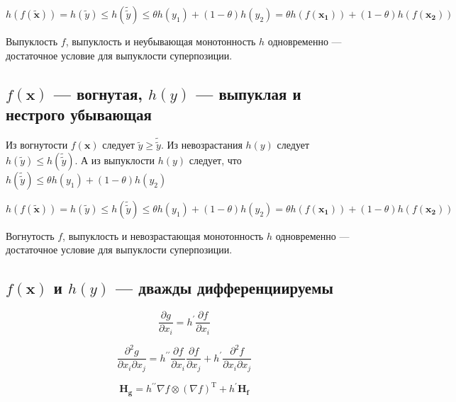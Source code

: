 	\begin{equation}
	h(f(\mathbf{\tilde{x}})) =h( \tilde{y}) \leqslant h(\tilde{\tilde{y}})
	\leqslant \theta h(y_1) + (1 - \theta) h(y_2) = \theta h(f(\mathbf{x_1})) + (1 -
	\theta) h(f(\mathbf{x_2}))
	\end{equation}
	
	Выпуклость $f$, выпуклость и неубывающая монотонность $h$ одновременно ---
	достаточное условие для выпуклости суперпозиции.
	
	\subsection{$f(\mathbf{x})$ --- вогнутая, $h(y)$ --- выпуклая и нестрого
		убывающая}
	
	Из вогнутости $f(\mathbf{x})$ следует $\tilde{y} \geqslant \tilde{\tilde{y}}$.
	Из невозрастания $h(y)$ следует $ h(\tilde{y}) \leqslant
	h({\tilde{\tilde{y}}})$. А из выпуклости $h(y)$ следует, что
	$h(\tilde{\tilde{y}}) \leqslant \theta h(y_1) + (1 - \theta) h(y_2)$
	
	\begin{equation}
	h(f(\mathbf{\tilde{x}})) =h( \tilde{y}) \leqslant h(\tilde{\tilde{y}})
	\leqslant \theta h(y_1) + (1 - \theta) h(y_2) = \theta h(f(\mathbf{x_1})) + (1 -
	\theta) h(f(\mathbf{x_2}))
	\end{equation}
	
	Вогнутость $f$, выпуклость и невозрастающая монотонность $h$ одновременно ---
	достаточное условие для выпуклости суперпозиции.
	
	\subsection{$f(\mathbf{x})$ и $h(y)$ --- дважды дифференциируемы}
	
	\begin{equation}
	\frac{\partial g}{\partial x_i} = h^{\prime} \frac{\partial f}{\partial x_i}
	\end{equation}
	
	\begin{equation}
	\frac{\partial^2 g}{\partial x_i \partial x_j} = h^{\prime\prime} \frac{\partial f}{\partial x_i}\frac{\partial f}{\partial x_j} + h^{\prime} \frac{\partial^2 f}{\partial x_i\partial x_j}
	\end{equation}
	
	\begin{equation}
	\mathbf{H_g} = h^{\prime\prime} \nabla f \otimes (\nabla f)^\text{T} + h^{\prime} \mathbf{H_f}
	\end{equation}
	
	


